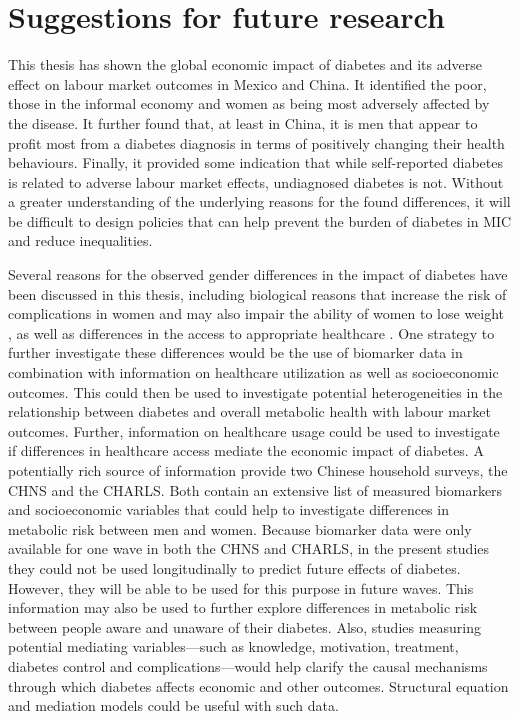 \section{Suggestions for future research}

This thesis has shown the global economic impact of diabetes and its adverse effect on labour market outcomes in Mexico and China. It identified the poor, those in the informal economy and women as being most adversely affected by the disease. It further found that, at least in China, it is men that appear to profit most from a diabetes diagnosis in terms of positively changing their health behaviours. Finally, it provided some indication that while self-reported diabetes is related to adverse labour market effects, undiagnosed diabetes is not. Without a greater understanding of the underlying reasons for the found differences, it will be difficult to design policies that can help prevent the burden of diabetes in \ac{MIC} and reduce inequalities.

Several reasons for the observed gender differences in the impact of diabetes have been discussed in this thesis, including biological reasons that increase the risk of complications in women \textcite{Peters2014,Peters2015,Arnetz2014,Roche2013,Policardo2014,Catalan2015,Engelmann2016,Seghieri2015} and may also impair the ability of women to lose weight \parencite{Penno2013}, as well as differences in the access to appropriate healthcare \parencite{Penno2013}. One strategy to further investigate these differences would be the use of biomarker data in combination with information on healthcare utilization as well as socioeconomic outcomes. This could then be used to investigate potential heterogeneities in the relationship between diabetes and overall metabolic health with labour market outcomes. Further, information on healthcare usage could be used to investigate if differences in healthcare access mediate the economic impact of diabetes. A potentially rich source of information provide two Chinese household surveys, the \acf{CHNS} and the \acf{CHARLS}. Both contain an extensive list of measured biomarkers and socioeconomic variables that could help to investigate differences in metabolic risk between men and women. Because biomarker data were only available for one wave in both the \ac{CHNS} and \ac{CHARLS}, in the present studies they could not be used longitudinally to predict future effects of diabetes. However, they will be able to be used for this purpose in future waves. This information may also be used to further explore differences in metabolic risk between people aware and unaware of their diabetes. Also, studies measuring potential mediating variables---such as knowledge, motivation, treatment, diabetes control and complications---would help clarify the causal mechanisms through which diabetes affects economic and other outcomes. Structural equation and mediation models could be useful with such data. 

